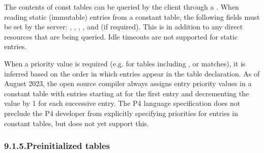 \documentclass[11pt]{article}
\begin{document}
{%
The contents of const tables can be queried by the client through a
. When reading static (immutable) entries from a constant table,
the following fields must be set by the server: , , ,
, and  (if required). This is in addition to any
direct resources that are being queried.  Idle timeouts are not supported for
static entries.%

When a priority value is required (e.g. for tables including ,
 or  matches), it is inferred based on the order in
which entries appear in the table declaration.  As of August 2023, the
open source  compiler always assigns entry priority values in a
constant table with  entries starting at  for the first entry
and decrementing the value by 1 for each successive entry.  The P4
language specification does not preclude the P4 developer from
explicitly specifying priorities for entries in constant tables, but
 does not yet support this.%

\subsubsection{9.1.5.\hspace*{0.5em}Preinitialized tables}\label{sec-preinitialized-tables}%

}
\end{document}
